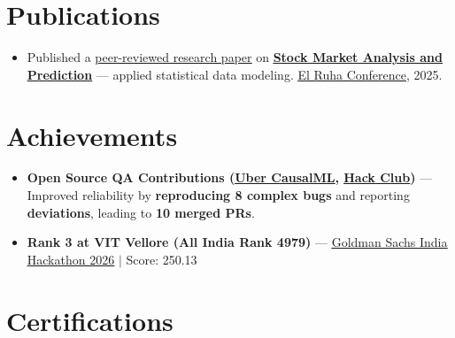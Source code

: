 \documentclass[a4paper,10pt]{article}
\newcommand{\ulink}[2]{\href{#1}{\uline{#2}}}
\begin{document}
\vspace{1pt}

\section{Publications}
\vspace{1pt}
\begin{itemize}[nosep, leftmargin=1.5em, itemsep=1pt, topsep=2pt]
  \item {\color[HTML]{0A0A0A}\fontsize{11}{14}\selectfont
  Published a \ulink{https://www.elruha.org/_files/ugd/614b1f_6b95e1b697bf452b9907ba46e0151c05.pdf\#page=774}{peer-reviewed research paper} on \ulink{https://github.com/su-jin1425/Set-Project}{\textbf{Stock Market Analysis and Prediction}} --- applied statistical data modeling. \ulink{https://www.elruha.org/congress-books}{El Ruha Conference}, 2025.}
\end{itemize}

\vspace{1pt}

\section{Achievements}
\vspace{1pt}
\begin{itemize}[nosep, leftmargin=1.5em, itemsep=1pt, topsep=2pt]
  \item {\color[HTML]{0A0A0A}\fontsize{11}{14}\selectfont \textbf{Open Source QA Contributions (\ulink{https://github.com/uber/causalml}{Uber CausalML}, \ulink{https://github.com/hackclub/stardance}{Hack Club})} --- Improved reliability by \textbf{reproducing 8 complex bugs} and reporting \textbf{deviations}, leading to \textbf{10 merged PRs}.}
  \item {\color[HTML]{0A0A0A}\fontsize{11}{14}\selectfont \textbf{Rank 3 at VIT Vellore (All India Rank 4979)} --- \ulink{https://www.hackerrank.com/contests/goldman-sachs-india-hackathon-2026-cs/leaderboard}{Goldman Sachs India Hackathon 2026} $|$ Score: 250.13}
\end{itemize}

\vspace{1pt}

\section{Certifications}
\vspace{1pt}
\end{document}
